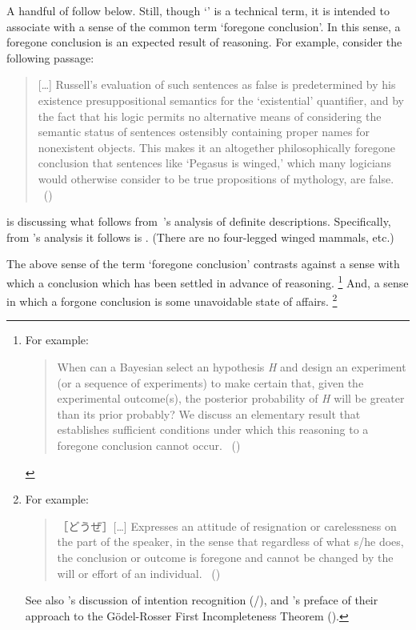 \begin{note}
  A handful of  follow below.
  Still, though `' is a technical term, it is intended to associate with a sense of the common term `foregone conclusion'.
  In this sense, a foregone conclusion is an expected result of reasoning.
  For example, consider the following passage:

  \begin{quote}
    [\dots] Russell's evaluation of such sentences as false is predetermined by his existence presuppositional semantics for the ‘existential' quantifier, and by the fact that his logic permits no alternative means of considering the semantic status of sentences ostensibly containing proper names for nonexistent objects.
    This makes it an altogether philosophically foregone conclusion that sentences like ‘Pegasus is winged,' which many logicians would otherwise consider to be true propositions of mythology, are false.\newline
    \mbox{ }\hfill\mbox{(\cite[6]{Jacquette:2002up})}
  \end{quote}

  \noindent \citeauthor{Jacquette:2002up} is discussing what follows from~\citeauthor{Russell:1905aa}'s analysis of definite descriptions.
  Specifically, from \citeauthor{Russell:1905aa}'s analysis it follows  is .
  (There are no four-legged winged mammals, etc.)

  The above sense of the term `foregone conclusion' contrasts against a sense with which a conclusion which has been settled in advance of reasoning.%
  \footnote{
    For example:
    \begin{quote}
      When can a Bayesian select an hypothesis \emph{H} and design an experiment (or a sequence of experiments) to make certain that, given the experimental outcome(s), the posterior probability of \emph{H} will be greater than its prior probably?
      We discuss an elementary result that establishes sufficient conditions under which this reasoning to a foregone conclusion cannot occur.%
      \mbox{ }\hfill\mbox{(\cite[1228]{Kadane:1996vu})}
    \end{quote}
  }
  And, a sense in which a forgone conclusion is some unavoidable state of affairs.%
  \footnote{
    For example:
    \begin{quote}
      ［どうぜ］[\dots] Expresses an attitude of resignation or carelessness on the part of the speaker, in the sense that regardless of what s/he does, the conclusion or outcome is foregone and cannot be changed by the will or effort of an individual.%
      \mbox{ }\hfill\mbox{(\cite[332--333]{kurufushamashii:2015un})}
    \end{quote}
    See also \citeauthor{Grice:1957vg}'s discussion of intention recognition (\citeyear[385]{Grice:1957vg}/\citeyear[219]{Grice:1989uf}), and \citeauthor{Machover:1996vu}'s preface of their approach to the G\"{o}del-Rosser First Incompleteness Theorem (\citeyear[viii]{Machover:1996vu}).
  }


\end{note}
